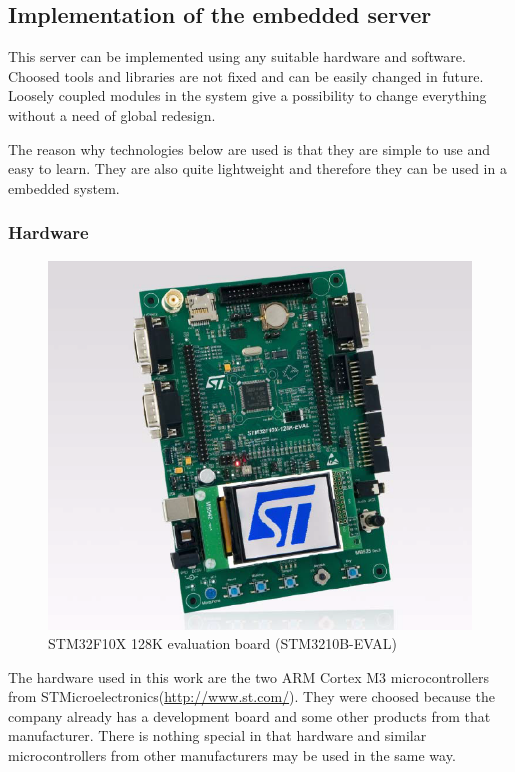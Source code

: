 \newpage
\subsection{Implementation of the embedded server}
This server can be implemented using any suitable hardware and software.
Choosed tools and libraries are not fixed and can be easily changed in
future.
Loosely coupled modules in the system give a possibility to change everything
without a need of global redesign.

The reason why technologies below are used is that they are simple to use and
easy to learn. They are also quite lightweight and therefore they can be used in
a embedded system.

\subsubsection{Hardware}
\label{sec:hardware}
\begin{center}
 \begin{figure}[h]
	\includegraphics[width=\textwidth]{../images/implementation/embedded_server/stm3210b-eval.png}
	\caption{STM32F10X 128K evaluation board (STM3210B-EVAL)
	\cite{stm_eval_board_manual}}
	\label{fig:stm_eval_board}
 \end{figure}
\end{center}

The hardware used in this work are the two ARM Cortex M3 microcontrollers from
STMicroelectronics(\url{http://www.st.com/}). They were choosed because the
company already has a development board  and some other products from that
manufacturer. There is nothing special in that hardware and similar
microcontrollers from other manufacturers may be used in the same way.

